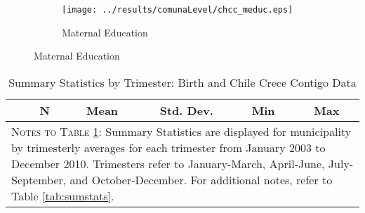 \documentclass[12pt]{article}
\begin{document}
\begin{spacing}{1.4}
\begin{landscape}
\begin{figure}[htpb!]
\begin{center}
\begin{subfigure}{.33\textwidth}
      \centering
      \texttt{[image: ../results/comunaLevel/chcc\_meduc.eps]}
      \caption{Maternal Education}
      \label{teen}
    \end{subfigure}
  \end{center}
\end{figure}
\end{landscape}



\begin{landscape}

\end{landscape}


\clearpage
\begin{table}[htpb!]
  \begin{center}
    \caption{Summary Statistics by Trimester: Birth and Chile Crece Contigo Data}
    \label{tab:sumstatsTri}
    \begin{tabular}{lccccc} \toprule
      & N& Mean & Std. Dev. & Min & Max \\ \midrule
       \bottomrule
      \multicolumn{6}{p{15.2cm}}{{\footnotesize \textsc{Notes to Table
            \ref{tab:sumstatsTri}}: Summary Statistics are displayed for
          municipality by trimesterly averages for
          each trimester from January 2003 to December 2010.  Trimesters
          refer to January-March, April-June, July-September, and
          October-December.  For additional notes, refer to Table
          \ref{tab:sumstats}.
      }}
      \end{tabular}
  \end{center}
\end{table}

\begin{landscape}

\end{landscape}


\end{spacing}
\end{document}
